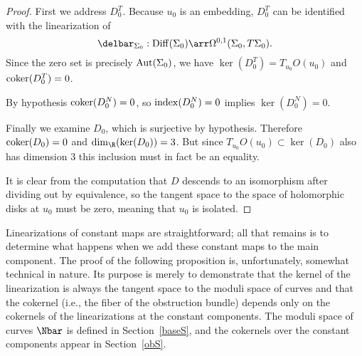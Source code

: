 \begin{lemma}
\begin{proof}
First we address $D_0^T$. Because $u_0$ is an embedding, $D_0^T$ can be identified with the linearization of
\[
\delbar_{\Sigma_0}:\Diff(\Sigma_0) \arr \Omega^{0,1}(\Sigma_0,T\Sigma_0).
\]
Since the zero set is precisely $\operatorname{Aut}(\Sigma_0)$, we have $\ker(D_0^T)=T_{u_0}O(u_0)$ and $\operatorname{coker}(D_0^T)=0$.

By hypothesis $\operatorname{coker}(D_0^N)=0$, so $\operatorname{index}(D_0^N)=0$ implies $\ker(D_0^N)=0$.

Finally we examine $D_0$, which is surjective by hypothesis. Therefore $\operatorname{coker}(D_0)=0$ and $\dim_\R(\ker(D_0))=3$. But since $T_{u_0}O(u_0) \subset \ker(D_0)$ also has dimension $3$ this inclusion must in fact be an equality.

It is clear from the computation that $D$ descends to an isomorphism after dividing out by equivalence, so the tangent space to the space of holomorphic disks at $u_0$ must be zero, meaning that $u_0$ is isolated.
\end{proof}
\end{lemma}

Linearizations of constant maps are straightforward; all that remains is to determine what happens when we add these constant maps to the main component. The proof of the following proposition is, unfortunately, somewhat technical in nature. Its purpose is merely to demonstrate that the kernel of the linearization is always the tangent space to the moduli space of curves and that the cokernel (i.e., the fiber of the obstruction bundle) depends only on the cokernels of the linearizations at the constant components. The moduli space of curves $\Nbar$ is defined in Section~\ref{baseS}, and the cokernels over the constant components appear in Section~\ref{obS}.


